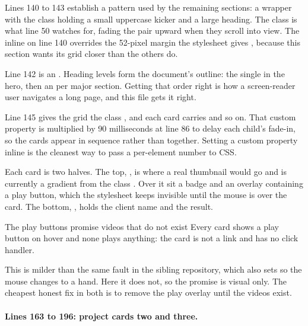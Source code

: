 Lines 140 to 143 establish a pattern used by the remaining sections: a wrapper with
the class  holding a small uppercase kicker and a large heading. The
 class is what  line 50 watches for, fading the pair
upward when they scroll into view. The inline  on line 140
overrides the 52-pixel margin the stylesheet gives , because
this section wants its grid closer than the others do.

Line 142 is an . Heading levels form the document's outline: the single
 in the hero, then an  per major section. Getting that order
right is how a screen-reader user navigates a long page, and this file gets it
right.

Line 145 gives the grid the class , and each card carries
 and so on. That custom property is multiplied by 90
milliseconds at  line 86 to delay each child's fade-in, so the cards
appear in sequence rather than together. Setting a custom property inline is the
cleanest way to pass a per-element number to CSS.

Each card is two halves. The top, , is where a real thumbnail
would go and is currently a gradient from the class . Over it sit a badge
and an overlay containing a play button, which the stylesheet keeps invisible until
the mouse is over the card. The bottom, , holds the client name and
the result.

\begin{honest}{The play buttons promise videos that do not exist}
Every card shows a play button on hover and none plays anything: the card is not a
link and has no click handler.

This is milder than the same fault in the sibling repository, which also sets
 so the mouse changes to a hand. Here it does not, so the
promise is visual only. The cheapest honest fix in both is to remove the play
overlay until the videos exist.
\end{honest}

\paragraph{Lines 163 to 196: project cards two and three.}

